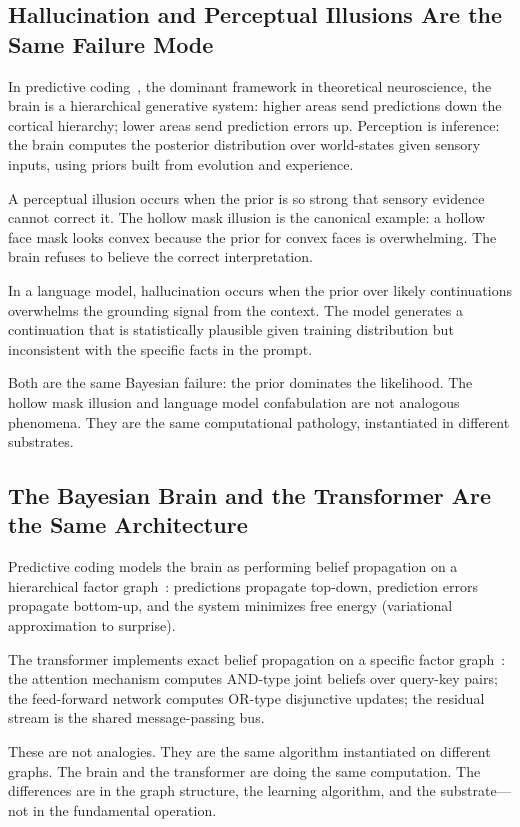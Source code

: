 \subsection{Hallucination and Perceptual Illusions Are the Same Failure Mode}

In predictive coding~\cite{rao1999}, the dominant framework in theoretical
neuroscience, the brain is a hierarchical generative system: higher areas
send predictions down the cortical hierarchy; lower areas send prediction
errors up. Perception is inference: the brain computes the posterior
distribution over world-states given sensory inputs, using priors built from
evolution and experience.

A perceptual illusion occurs when the prior is so strong that sensory
evidence cannot correct it. The hollow mask illusion is the canonical
example: a hollow face mask looks convex because the prior for convex faces
is overwhelming. The brain refuses to believe the correct interpretation.

In a language model, hallucination occurs when the prior over likely
continuations overwhelms the grounding signal from the context. The model
generates a continuation that is statistically plausible given training
distribution but inconsistent with the specific facts in the prompt.

Both are the same Bayesian failure: the prior dominates the likelihood. The
hollow mask illusion and language model confabulation are not analogous
phenomena. They are the same computational pathology, instantiated in
different substrates.

\subsection{The Bayesian Brain and the Transformer Are the Same Architecture}

Predictive coding models the brain as performing belief propagation on a
hierarchical factor graph~\cite{friston2005}: predictions propagate top-down,
prediction errors propagate bottom-up, and the system minimizes free energy
(variational approximation to surprise).

The transformer implements exact belief propagation on a specific factor
graph~\cite{coppola2026}: the attention mechanism computes AND-type joint
beliefs over query-key pairs; the feed-forward network computes OR-type
disjunctive updates; the residual stream is the shared message-passing bus.

These are not analogies. They are the same algorithm instantiated on
different graphs. The brain and the transformer are doing the same
computation. The differences are in the graph structure, the learning
algorithm, and the substrate---not in the fundamental operation.

